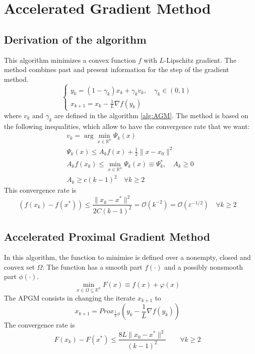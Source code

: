 \documentclass[12pt, openany]{report}
\newcommand{\R}{\mathbb{R}}
\renewcommand{\O}{\mathcal{O}}
\theoremstyle{definition}
\begin{document}
\section{Accelerated Gradient Method}
\subsection{Derivation of the algorithm}
This algorithm minimizes a convex function $f$ with $L$-Lipschitz gradient. The method combines past and present information for the step of the gradient method. 
\begin{equation}
	\begin{cases}
		y_k = (1-\gamma_k)x_k + \gamma_k v_k, \quad \gamma_k \in (0,1)\\
		x_{k+1} = x_k - \frac{1}{L} \nabla f(y_k)
	\end{cases}
\end{equation}
where $v_k$ and $\gamma_k$ are defined in the algorithm \ref{alg:AGM}. The method is based on the following inequalities, which allow to have the convergence rate that we want:
\begin{equation}
	\begin{aligned}
		&v_k = \arg \min_{x \in \R^n} \Psi_k (x)\\
		&\Psi_k (x) \leq A_k f(x) + \frac{1}{2} \|x-x_0\|^2\\
		&A_k f(x_k) \leq \min_{x \in \R^n} \Psi_k (x) \equiv \Psi_k^*, \quad A_k \geq 0\\
		&A_k \geq c(k-1)^2 \quad \forall k \geq 2
	\end{aligned}
\end{equation}
This convergence rate is 
\begin{equation}
		\left(f(x_k)-f(x^*)\right) \leq \frac{\|x_k-x^*\|^2}{2 C(k-1)^2} = \O(k^{-2}) = \O(\varepsilon^{-1/2}) \quad \forall k \geq 2
\end{equation}
\subsection{Accelerated Proximal Gradient Method}
In this algorithm, the function to minimise is defined over a nonempty, closed and convex set $\Omega$. The function has a smooth part $f(\cdot)$ and a possibly nonsmooth part $\phi(\cdot)$. 
\begin{equation}
	\min_{x \in \Omega\subseteq \R^n} F(x)\equiv f(x) + \varphi(x)
\end{equation}
The APGM consists in changing the iterate $x_{k+1}$ to 
\begin{equation}
	x_{k+1} = Prox_{\frac{1}{L}\phi}\left(y_k - \frac{1}{L}\nabla f(y_k)\right)
\end{equation}
The convergence rate is 
\begin{equation}
	F(x_k)-F(x^*) \le \frac{8L\|x_0-x^*\|^2}{(k-1)^2} \qquad \forall k\ge 2
\end{equation}
\end{document}
